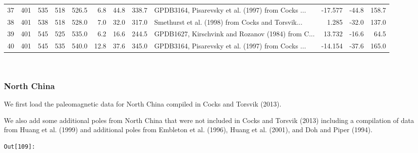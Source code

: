 \documentclass[11pt]{article}
\begin{document}
\begin{sidewaystable}
{\begin{tabular}{lrrrrrrrlrrr}
37 &       401 &       535 &      518 &       526.5 &   6.8 &  44.8 &  338.7 &  GPDB3164, Pisarevsky et al. (1997) from Cocks ... &   -17.577 &   -44.8 &   158.7 \\
38 &       401 &       538 &      518 &       528.0 &   7.0 &  32.0 &  317.0 &  Smethurst et al. (1998) from Cocks and Torsvik... &     1.285 &   -32.0 &   137.0 \\
39 &       401 &       545 &      525 &       535.0 &   6.2 &  16.6 &  244.5 &  GPDB1627, Kirschvink and Rozanov (1984) from C... &    13.732 &   -16.6 &    64.5 \\
40 &       401 &       545 &      535 &       540.0 &  12.8 &  37.6 &  345.0 &  GPDB3164, Pisarevsky et al. (1997) from Cocks ... &   -14.154 &   -37.6 &   165.0 \\
\bottomrule
\end{tabular}}
\end{sidewaystable}
    


    \begin{center}
    \end{center}
    { \hspace*{\fill} \\}
    
    \subsubsection{North China}\label{north-china}

    We first load the paleomagnetic data for North China compiled in Cocks
and Torsvik (2013).


    We also add some additional poles from North China that were not
included in Cocks and Torsvik (2013) including a compilation of data
from Huang et al. (1999) and additional poles from Embleton et al.
(1996), Huang et al. (2001), and Doh and Piper (1994).

\texttt{\color{outcolor}Out[{\color{outcolor}109}]:}
    
\end{document}
